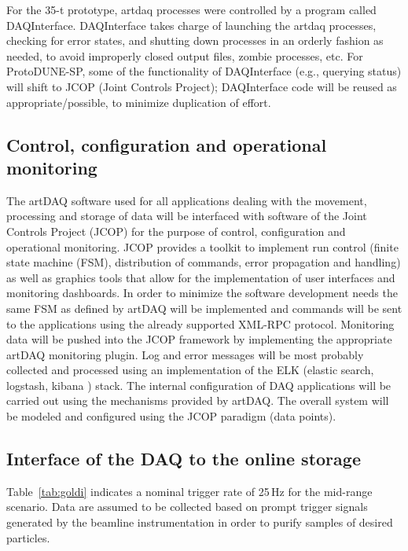 For the 35-t prototype, artdaq processes were controlled by a program called
DAQInterface. DAQInterface takes 
charge of launching the artdaq processes, checking for error states, and
shutting down
 processes in an orderly fashion as needed, to avoid improperly closed output files,
zombie processes, etc. For ProtoDUNE-SP, some of the functionality of DAQInterface (e.g., querying  status) will shift to JCOP (Joint Controls Project);
DAQInterface code will be reused as appropriate/possible, to minimize duplication of effort. 



\subsection{Control, configuration and operational monitoring}

The artDAQ software used for all applications dealing with the movement,
processing and storage of data will be interfaced with software of the
Joint Controls Project (JCOP) for the purpose of control, configuration
and operational monitoring.  JCOP provides a toolkit to implement run
control (finite state machine (FSM), distribution of commands, error
propagation and handling) as well as graphics tools that allow for the
implementation of user interfaces and monitoring dashboards.  In order to
minimize the software development needs the same FSM as defined by artDAQ
will be implemented and commands will be sent to the applications using
the already supported XML-RPC protocol.  Monitoring data will be pushed
into the JCOP framework by implementing the appropriate artDAQ monitoring
plugin.  Log and error messages will be most probably collected and
processed using an implementation of the ELK (elastic search, logstash,
kibana \cite{elastic:kibana}) stack. 
 The internal configuration of DAQ applications will be
carried out using the mechanisms provided by artDAQ. The overall system
will be modeled and configured using the JCOP paradigm (data points).


\subsection{Interface of the DAQ to the online storage}
\label{sec:DAQ_online_interface}

Table~\ref{tab:goldi} indicates a nominal trigger rate of 25\,Hz for
the mid-range scenario. 
 Data are assumed to be
collected based on prompt trigger signals generated by the beamline
instrumentation in order to purify samples of desired particles.

